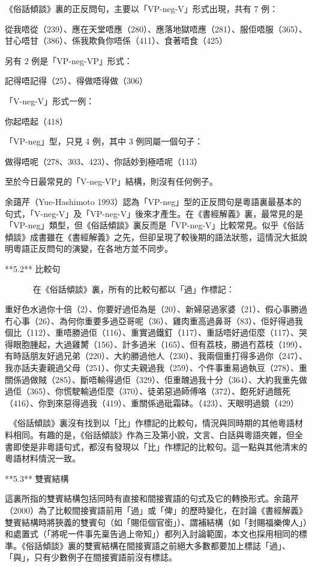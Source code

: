 《俗話傾談》裏的正反問句，主要以「VP-neg-V」形式出現，共有 7 例：

從我唔從（239）、應在天堂唔應（280）、應落地獄唔應（281）、服佢唔服（365）、甘心唔甘（386）、係我欺負你唔係（411）、食著唔食（425）

另有 2 例是「VP-neg-VP」形式：

記得唔記得（25）、得做唔得做（306）

「V-neg-V」形式一例：

你起唔起（418）

「VP-neg」型，只見 4 例，其中 3 例同屬一個句子：

做得唔呢（278、303、423）、你話妙到極唔呢（113）

至於今日最常見的「V-neg-VP」結構，則沒有任何例子。

余藹芹（Yue-Hashimoto 1993）認為「VP-neg」型的正反問句是粵語裏最基本的句式，「V-neg-V」及「VP-neg-V」後來才產生。在《書經解義》裏，最常見的是「VP-neg」類型，但《俗話傾談》裏反而是「VP-neg-V」比較常見。似乎《俗話傾談》成書雖在《書經解義》之先，但卻呈現了較後期的語法狀態，這情況大抵說明粵語正反問句的演變，在各地方並不同步。

**5.2** 比較句

       在《俗話傾談》裏，所有的比較句都以「過」作標記：

重好色水過你十倍（2）、你要好過佢為是（20）、新婦惡過家婆（21）、假心事勝過冇心事（26）、為何你重要多過亞哥呢（36）、雞肉重高過鼻哥（83）、佢好得過我個比（112）、重唔勝過佢（116）、重實過鐵釘（117）、重話唔好過佢麼（117）、哭得眼胞腫起，大過雞膥（156）、計多過米（165）、但有荔枝，勝過冇荔枝（199）、有時話朋友好過兄弟（220）、大約勝過他人（230）、我兩個重打得多過你（247）、我亦話夫妻親過父母（251）、你丈夫親過我（259）、个件事重易過執豆（278）、重關係過做賊（285）、斷唔輸得過佢（329）、佢重醜過我十分（364）、大約我重先做過佢（365）、你慌駛輸過佢麼（370）、徒弟惡過師傅咯（372）、飽死好過餓死（416）、你到來惡得過我（419）、重關係過砒霜砵。（423）、天眼明過鏡（429）

 《俗話傾談》裏沒有找到以「比」作標記的比較句，情況與同時期的其他粵語材料相同。有趣的是，《俗話傾談》作為三及第小說，文言、白話與粵語夾雜，但全書即使是非粵語句式，都沒有發現以「比」作標記的比較句。這一點與其他清末的粵語材料情況一致。

**5.3** 雙賓結構

這裏所指的雙賓結構包括同時有直接和間接賓語的句式及它的轉換形式。余藹芹（2000）為了比較間接賓語前用「過」或「俾」的歷時變化，在討論《書經解義》雙賓結構時將狹義的雙賓句（如「賜佢個官銜」）、謂補結構（如「封賜福樂俾人」）和處置式（「將呢一件事先稟告過上帝知」）都列入討論範圍，本文也採用相同的標準。《俗話傾談》裏的雙賓結構在間接賓語之前絕大多數都要加上標誌「過」、「與」，只有少數例子在間接賓語前沒有標誌。

